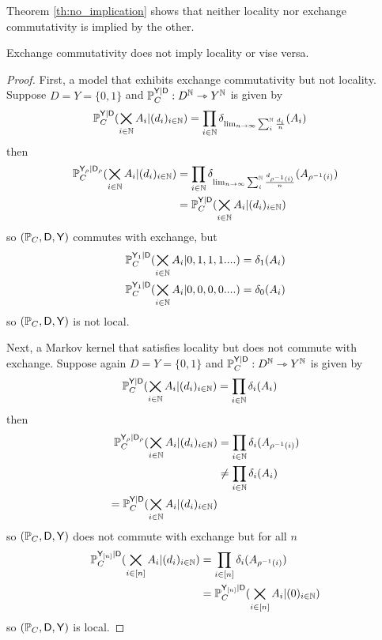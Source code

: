 Theorem \ref{th:no_implication} shows that neither locality nor exchange commutativity is implied by the other.

\begin{theorem}\label{th:no_implication}
Exchange commutativity does not imply locality or vise versa.
\end{theorem}

\begin{proof}
First, a model that exhibits exchange commutativity but not locality. Suppose $D=Y=\{0,1\}$ and $\mathbb{P}_C^{\mathsf{Y}|\mathsf{D}}:D^{\mathbb{N}}\rightarrowtriangle Y^{\mathbb{N}}$ is given by
\begin{align}
    \mathbb{P}_C^{\mathsf{Y}|\mathsf{D}}(\bigtimes_{i\in\mathbb{N}} A_i |(d_i)_{i\in\mathbb{N}}) &= \prod_{i\in \mathbb{N}} \delta_{\lim_{n\to\infty} \sum_{i}^{\mathbb{N}} \frac{d_i}{n}}(A_i)
\end{align}
then 
\begin{align}
    \mathbb{P}_C^{\mathsf{Y}_\rho|\mathsf{D}_\rho}(\bigtimes_{i\in\mathbb{N}} A_i |(d_i)_{i\in\mathbb{N}}) &= \prod_{i\in \mathbb{N}} \delta_{\lim_{n\to\infty} \sum_{i}^{\mathbb{N}} \frac{d_{\rho^{-1}(i)}}{n}}(A_{\rho^{-1}(i)})\\
    &= \mathbb{P}_C^{\mathsf{Y}|\mathsf{D}}(\bigtimes_{i\in\mathbb{N}} A_i |(d_i)_{i\in\mathbb{N}})
\end{align}
so $(\mathbb{P}_C,\mathsf{D},\mathsf{Y})$ commutes with exchange, but
\begin{align}
    \mathbb{P}_C^{\mathsf{Y}_1|\mathsf{D}}(\bigtimes_{i\in\mathbb{N}} A_i |0,1,1,1....) &= \delta_1(A_i)\\
    \mathbb{P}_C^{\mathsf{Y}_1|\mathsf{D}}(\bigtimes_{i\in\mathbb{N}} A_i |0,0,0,0....) &= \delta_0(A_i)
\end{align}
so $(\mathbb{P}_C,\mathsf{D},\mathsf{Y})$ is not local.

Next, a Markov kernel that satisfies locality but does not commute with exchange. Suppose again $D=Y=\{0,1\}$ and $\mathbb{P}_C^{\mathsf{Y}|\mathsf{D}}:D^{\mathbb{N}}\rightarrowtriangle Y^{\mathbb{N}}$ is given by
\begin{align}
    \mathbb{P}_C^{\mathsf{Y}|\mathsf{D}}(\bigtimes_{i\in\mathbb{N}} A_i |(d_i)_{i\in\mathbb{N}}) &= \prod_{i\in \mathbb{N}} \delta_i(A_i)
\end{align}
then
\begin{align}
    \mathbb{P}_C^{\mathsf{Y}_\rho|\mathsf{D}_\rho}(\bigtimes_{i\in\mathbb{N}} A_i |(d_i)_{i\in\mathbb{N}}) &= \prod_{i\in \mathbb{N}} \delta_i(A_{\rho^{-1}(i)})\\
    &\neq \prod_{i\in \mathbb{N}} \delta_i(A_{i})\\
    =\mathbb{P}_C^{\mathsf{Y}|\mathsf{D}}(\bigtimes_{i\in\mathbb{N}} A_i |(d_i)_{i\in\mathbb{N}})
\end{align}
so $(\mathbb{P}_C,\mathsf{D},\mathsf{Y})$ does not commute with exchange but for all $n$
\begin{align}
    \mathbb{P}_C^{\mathsf{Y}_{[n]}|\mathsf{D}}(\bigtimes_{i\in[n]} A_i |(d_i)_{i\in\mathbb{N}}) &= \prod_{i\in [n]} \delta_i(A_{\rho^{-1}(i)})\\
    &= \mathbb{P}_C^{\mathsf{Y}_{[n]}|\mathsf{D}}(\bigtimes_{i\in[n]} A_i |(0)_{i\in\mathbb{N}})
\end{align}
so $(\mathbb{P}_C,\mathsf{D},\mathsf{Y})$ is local.
\end{proof}

